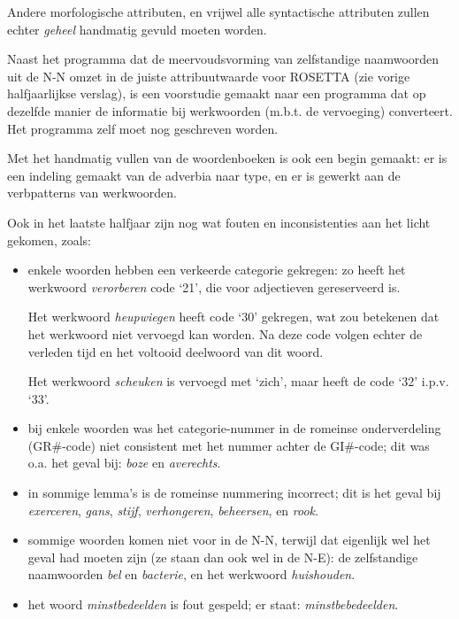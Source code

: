 Andere morfologische attributen, en vrijwel alle syntactische attributen 
zullen echter {\em geheel} handmatig gevuld moeten worden. 

Naast het programma dat de meervoudsvorming van zelfstandige naamwoorden uit
de N-N omzet in de juiste attribuutwaarde voor ROSETTA (zie vorige 
halfjaarlijkse verslag), is
een voorstudie gemaakt naar een programma dat op dezelfde manier de informatie
bij werkwoorden (m.b.t. de vervoeging) converteert. Het programma zelf moet nog 
geschreven worden.

Met het handmatig vullen van de woordenboeken is ook een begin gemaakt: er is 
een indeling gemaakt van de adverbia naar type, en er is gewerkt aan de 
verbpatterns van werkwoorden.

Ook in het laatste halfjaar zijn nog wat fouten en inconsistenties aan het licht
gekomen, zoals:
\begin{itemize}

   \item enkele woorden hebben een verkeerde categorie gekregen:
         zo heeft het werkwoord {\em verorberen} code `21', die voor 
         adjectieven gereserveerd is. 

         Het werkwoord {\em heupwiegen}
         heeft code `30' gekregen, wat zou betekenen dat het werkwoord niet
         vervoegd kan worden. Na deze code volgen echter de verleden tijd en
         het voltooid deelwoord van dit woord.

         Het werkwoord {\em scheuken} is vervoegd met `zich', maar heeft 
         de code `32' i.p.v. `33'.
         
   \item bij enkele woorden was het categorie-nummer in de romeinse 
         onderverdeling (GR\#-code) niet consistent met het nummer 
         achter de GI\#-code; dit was o.a. het geval bij: 
         {\em boze} en {\em averechts}.

   \item in sommige lemma's is de romeinse nummering incorrect; dit is het 
         geval bij {\em exerceren}, {\em gans}, {\em stijf}, {\em verhongeren},
         {\em beheersen}, en {\em rook}.

   \item sommige woorden komen niet voor in de N-N, terwijl dat eigenlijk
         wel het geval had moeten zijn (ze staan dan ook wel in de N-E):
         de zelfstandige naamwoorden {\em bel} en {\em bacterie}, en het 
         werkwoord {\em huishouden}.

   \item het woord {\em minstbedeelden} is fout gespeld; er staat:
         {\em minstbebedeelden}.

\end{itemize}

